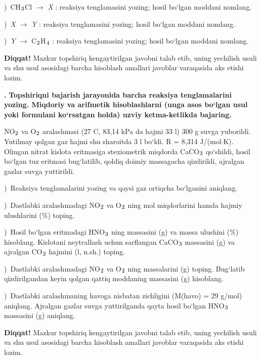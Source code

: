 \documentclass[11pt,a4paper]{article}
\renewcommand{\textsubscript}[1]{\ensuremath{_{\text{\fontsize{8}{8}\selectfont #1}}}}
\newcommand{\qn}[1]{\textbf{\fontsize{11.5}{13}\selectfont #1}}
\newcommand{\qsep}{\par\vspace{13pt}}
\newcommand{\diqqat}[1]{\par\smallskip\noindent\textbf{Diqqat!} #1\par\medskip}
\begin{document}
)\ CH\textsubscript{3}Cl $\to$ \textit{X} : reaksiya tenglamasini yozing; hosil bo`lgan moddani nomlang.\par
{})\ \textit{X} $\to$ \textit{Y} : reaksiya tenglamasini yozing; hosil bo`lgan moddani nomlang.\par
{})\ \textit{Y} $\to$ C\textsubscript{2}H\textsubscript{4} : reaksiya tenglamasini yozing; hosil bo`lgan moddani nomlang.\par
\diqqat{Mazkur topshiriq kengaytirilgan javobni talab etib, uning yechilish usuli va shu usul asosidagi barcha hisoblash amallari javoblar varaqasida aks etishi lozim.}\qsep
\noindent\qn{43.} \textbf{Topshiriqni bajarish jarayonida barcha reaksiya tenglamalarini yozing. Miqdoriy va arifmetik hisoblashlarni (unga asos bo`lgan usul yoki formulani ko`rsatgan holda) uzviy ketma-ketlikda bajaring.}\par\smallskip
NO\textsubscript{2} va O\textsubscript{2} aralashmasi (27 \textdegree{}C, 83,14 kPa da hajmi 33 l) 300 g suvga yuborildi. Yutilmay qolgan gaz hajmi shu sharoitda 3 l bo`ldi. R = 8,314 J/(mol$\cdot$K). Olingan nitrat kislota eritmasiga stexiometrik miqdorda CaCO\textsubscript{3} qo`shildi, hosil bo`lgan tuz eritmasi bug`latilib, qoldiq doimiy massagacha qizdirildi, ajralgan gazlar suvga yuttirildi.\par
{})\ Reaksiya tenglamalarini yozing va qaysi gaz ortiqcha bo`lganini aniqlang.\par
{})\ Dastlabki aralashmadagi NO\textsubscript{2} va O\textsubscript{2} ning mol miqdorlarini hamda hajmiy ulushlarini (\%) toping.\par
{})\ Hosil bo`lgan eritmadagi HNO\textsubscript{3} ning massasini (g) va massa ulushini (\%) hisoblang. Kislotani neytrallash uchun sarflangan CaCO\textsubscript{3} massasini (g) va ajralgan CO\textsubscript{2} hajmini (l, n.sh.) toping.\par
{})\ Dastlabki aralashmadagi NO\textsubscript{2} va O\textsubscript{2} ning massalarini (g) toping. Bug`latib qizdirilgandan keyin qolgan qattiq moddaning massasini (g) hisoblang.\par
{})\ Dastlabki aralashmaning havoga nisbatan zichligini (M(havo) = 29 g/mol) aniqlang. Ajralgan gazlar suvga yuttirilganda qayta hosil bo`lgan HNO\textsubscript{3} massasini (g) aniqlang.\par
\diqqat{Mazkur topshiriq kengaytirilgan javobni talab etib, uning yechilish usuli va shu usul asosidagi barcha hisoblash amallari javoblar varaqasida aks etishi lozim.}\qsep
\end{document}
